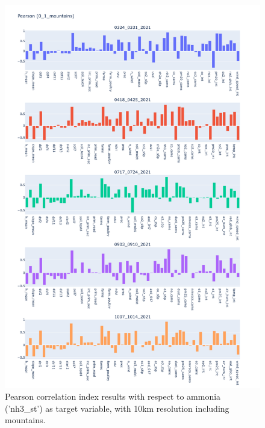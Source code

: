 \begin{figure}[H]
    \centering
    \includegraphics[scale=0.35]{images/tests/0_1_mountainsnh3_st_pearson.png}
    \caption{Pearson correlation index results with respect to ammonia ('nh3\_st') as target variable, with 10km resolution including mountains.}
    
\end{figure}
